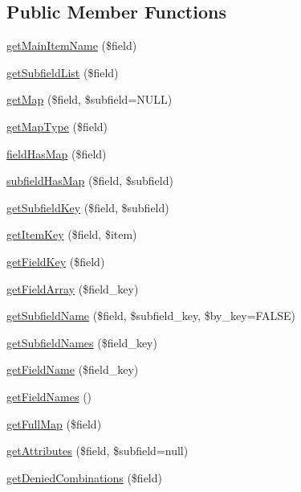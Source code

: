 \subsection*{Public Member Functions}
\begin{DoxyCompactItemize}
\item 
\hyperlink{classIsisMap_af689f27e67b0b38a3e880ead17a487f5}{getMainItemName} (\$field)
\item 
\hyperlink{classIsisMap_ad0b61ec2fbfb011db4bf89c5f54efab4}{getSubfieldList} (\$field)
\item 
\hyperlink{classIsisMap_a29eb2c45b51f95fdfb9ff7af770ca6ce}{getMap} (\$field, \$subfield=NULL)
\item 
\hyperlink{classIsisMap_a62b933be483fb6704e12e41f10286cd5}{getMapType} (\$field)
\item 
\hyperlink{classIsisMap_af94e1fc5d73a6272f04a60c0acaeb409}{fieldHasMap} (\$field)
\item 
\hyperlink{classIsisMap_ab5493af644e529c11a3c3e6edc37c3b9}{subfieldHasMap} (\$field, \$subfield)
\item 
\hyperlink{classIsisMap_ae5d904b8407b38751656715fb9efd7cf}{getSubfieldKey} (\$field, \$subfield)
\item 
\hyperlink{classIsisMap_a994934784caa4149737bda55160a459f}{getItemKey} (\$field, \$item)
\item 
\hyperlink{classIsisMap_ac6a4eed048ddfa62c76e6d813754af81}{getFieldKey} (\$field)
\item 
\hyperlink{classIsisMap_aee1953b6e46b1612c725b2da82414d14}{getFieldArray} (\$field\_\-key)
\item 
\hyperlink{classIsisMap_a58d739ea1f014befdafef7035d46c074}{getSubfieldName} (\$field, \$subfield\_\-key, \$by\_\-key=FALSE)
\item 
\hyperlink{classIsisMap_a1f30d131831b036271b0a1ff6d5d9d68}{getSubfieldNames} (\$field\_\-key)
\item 
\hyperlink{classIsisMap_ae41313537e399f15ff16a4db887cf5b9}{getFieldName} (\$field\_\-key)
\item 
\hyperlink{classIsisMap_a157fffbdb6c533a66e3f73674bfd8ea4}{getFieldNames} ()
\item 
\hyperlink{classIsisMap_a2ca9d83aad166eed936f6f9ef8df05e3}{getFullMap} (\$field)
\item 
\hyperlink{classIsisMap_a64c7193dd61a21c1af3624152d31ee51}{getAttributes} (\$field, \$subfield=null)
\item 
\hyperlink{classIsisMap_a57808b2ac5892d71308c629b6ae990ff}{getDeniedCombinations} (\$field)
\end{DoxyCompactItemize}
